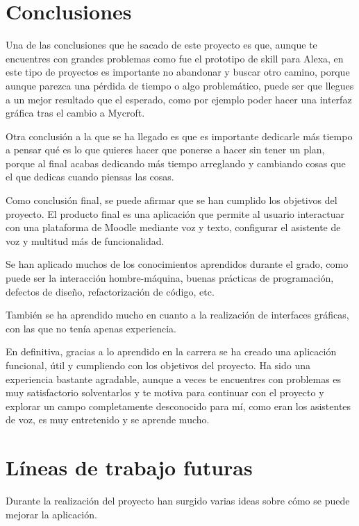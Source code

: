 
\section{Conclusiones}

Una de las conclusiones que he sacado de este proyecto es que, aunque te encuentres con grandes problemas como fue el prototipo de skill para Alexa, en este tipo de proyectos es importante no abandonar y buscar otro camino, porque aunque parezca una pérdida de tiempo o algo problemático, puede ser que llegues a un mejor resultado que el esperado, como por ejemplo poder hacer una interfaz gráfica tras el cambio a Mycroft.

Otra conclusión a la que se ha llegado es que es importante dedicarle más tiempo a pensar qué es lo que quieres hacer que ponerse a hacer sin tener un plan, porque al final acabas dedicando más tiempo arreglando y cambiando cosas que el que dedicas cuando piensas las cosas.

Como conclusión final, se puede afirmar que se han cumplido los objetivos del proyecto. El producto final es una aplicación que permite al usuario interactuar con una plataforma de Moodle mediante voz y texto, configurar el asistente de voz y multitud más de funcionalidad.

Se han aplicado muchos de los conocimientos aprendidos durante el grado, como puede ser la interacción hombre-máquina, buenas prácticas de programación, defectos de diseño, refactorización de código, etc.

También se ha aprendido mucho en cuanto a la realización de interfaces gráficas, con las que no tenía apenas experiencia.

En definitiva, gracias a lo aprendido en la carrera se ha creado una aplicación funcional, útil y cumpliendo con los objetivos del proyecto. Ha sido una experiencia bastante agradable, aunque a veces te encuentres con problemas es muy satisfactorio solventarlos y te motiva para continuar con el proyecto y explorar un campo completamente desconocido para mí, como eran los asistentes de voz, es muy entretenido y se aprende mucho.

\section{Líneas de trabajo futuras}

Durante la realización del proyecto han surgido varias ideas sobre cómo se puede mejorar la aplicación.

